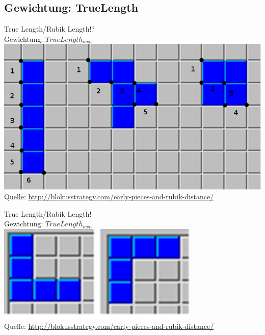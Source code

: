 \documentclass[12pt, draft]{beamer}
\begin{document}
\subsection{Gewichtung: TrueLength}
\begin{frame}
	True Length/Rubik Length!?\\
	\pause
	Gewichtung: $TrueLength_{own}$\\
	\pause
	\includegraphics[width=0.8\linewidth]{media/wgh6.png}\\
	\tiny Quelle: \url{http://blokusstrategy.com/early-pieces-and-rubik-distance/}
\end{frame}
\begin{frame}
	True Length/Rubik Length!\\
	Gewichtung: $TrueLength_{own}$\\
	\includegraphics[width=0.8\linewidth]{media/wgh7.png}\\
	\tiny Quelle: \url{http://blokusstrategy.com/early-pieces-and-rubik-distance/}
\end{frame}
\end{document}
